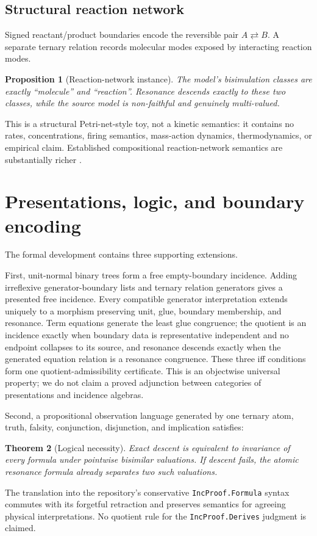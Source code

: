 \documentclass[11pt]{article}
\newtheorem{theorem}{Theorem}[section]
\newtheorem{proposition}[theorem]{Proposition}
\theoremstyle{definition}
\begin{document}
\subsection{Structural reaction network}

Signed reactant/product boundaries encode the reversible pair $A\rightleftarrows
B$.  A separate ternary relation records molecular modes exposed by interacting
reaction modes.

\begin{proposition}[Reaction-network instance]
The model's bisimulation classes are exactly ``molecule'' and ``reaction''.
Resonance descends exactly to these two classes, while the source model is
non-faithful and genuinely multi-valued.
\end{proposition}

This is a structural Petri-net-style toy, not a kinetic semantics: it contains
no rates, concentrations, firing semantics, mass-action dynamics,
thermodynamics, or empirical claim.  Established compositional reaction-network
semantics are substantially richer \cite{BaezPollard2017,CategoriesOfNets}.

\section{Presentations, logic, and boundary encoding}

The formal development contains three supporting extensions.

First, unit-normal binary trees form a free empty-boundary incidence.  Adding
irreflexive generator-boundary lists and ternary relation generators gives a
presented free incidence.  Every compatible generator interpretation extends
uniquely to a morphism preserving unit, glue, boundary membership, and
resonance.  Term equations generate the least glue congruence; the quotient is
an incidence exactly when boundary data is representative independent and no
endpoint collapses to its source, and resonance descends exactly when the
generated equation relation is a resonance congruence.  These three iff
conditions form one quotient-admissibility certificate.  This is an objectwise
universal property; we do not claim a proved adjunction between categories of
presentations and incidence algebras.

Second, a propositional observation language generated by one ternary atom,
truth, falsity, conjunction, disjunction, and implication satisfies:
\begin{theorem}[Logical necessity]
Exact descent is equivalent to invariance of every formula under pointwise
bisimilar valuations.  If descent fails, the atomic resonance formula already
separates two such valuations.
\end{theorem}
The translation into the repository's conservative \texttt{IncProof.Formula}
syntax commutes with its forgetful retraction and preserves semantics for
agreeing physical interpretations.  No quotient rule for the
\texttt{IncProof.Derives} judgment is claimed.
\end{document}
